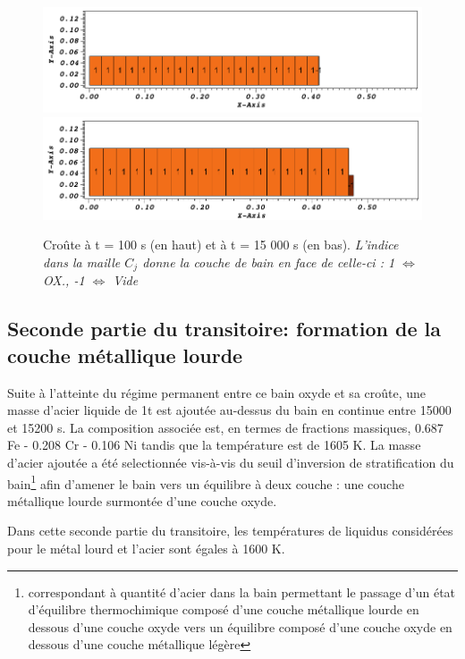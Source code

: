 \begin{figure}[H]
\centering
\includegraphics[width=\textwidth, keepaspectratio=true]{Figures/coriumCrust_100.png}\\
\includegraphics[width=\textwidth, keepaspectratio=true]{Figures/coriumCrust_15000.png}
\caption{Croûte à t = 100 s (en haut) et à t = 15 000 s (en bas). \textit{L'indice dans la maille $C_j$ donne la couche de bain en face de celle-ci : 1 $\Leftrightarrow$ OX., -1 $\Leftrightarrow$ Vide}}
\label{fig:croutes_1}
\end{figure}

\subsection{Seconde partie du transitoire: formation de la couche métallique lourde}

Suite à l'atteinte du régime permanent entre ce bain oxyde et sa croûte, une masse d'acier liquide de 1t est ajoutée au-dessus du bain en continue entre 15000 et 15200 s. La composition associée est, en termes de fractions massiques, 0.687 Fe - 0.208 Cr - 0.106 Ni tandis que la température est de 1605 K. La masse d'acier ajoutée a été selectionnée vis-à-vis du seuil d'inversion de stratification du bain\footnote{correspondant à quantité d'acier dans la bain permettant le passage d'un état d'équilibre thermochimique composé d'une couche métallique lourde en dessous d'une couche oxyde vers un équilibre composé d'une couche oxyde en dessous d'une couche métallique légère} afin d'amener le bain vers un équilibre à deux couche : une couche métallique lourde surmontée d'une couche oxyde.

Dans cette seconde partie du transitoire, les températures de liquidus considérées pour le métal lourd et l'acier sont égales à 1600 K.

